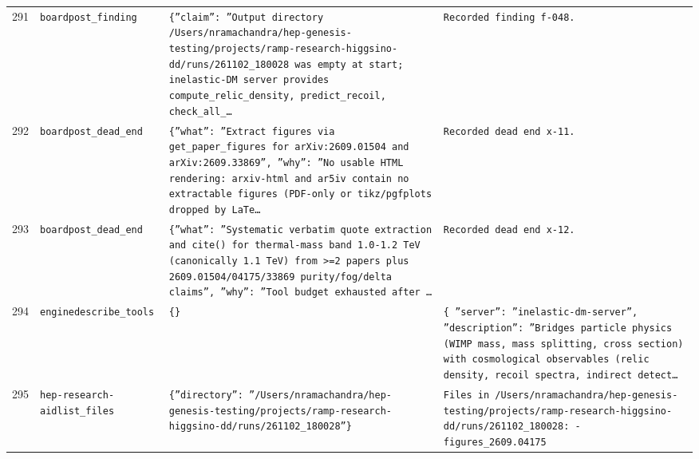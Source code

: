 \documentclass[11pt,a4paper]{article}
\begin{document}
\begin{longtable}{@{}p{}p{}p{}p{}@{}}
291 & \texttt{board}\newline\texttt{post\_\allowbreak{}finding} & \texttt{\{''claim'':\allowbreak{} ''Output directory /\allowbreak{}Users/\allowbreak{}nramachandra/\allowbreak{}hep-genesis-testing/\allowbreak{}projects/\allowbreak{}ramp-research-higgsino-dd/\allowbreak{}runs/\allowbreak{}261102\_\allowbreak{}180028 was empty at start;\allowbreak{} inelastic-DM server provides compute\_\allowbreak{}relic\_\allowbreak{}density,\allowbreak{} predict\_\allowbreak{}recoil,\allowbreak{} check\_\allowbreak{}all\_\allowbreak{}\ldots{}\allowbreak{}} & \texttt{Recorded finding f-048.} \\
292 & \texttt{board}\newline\texttt{post\_\allowbreak{}dead\_\allowbreak{}end} & \texttt{\{''what'':\allowbreak{} ''Extract figures via get\_\allowbreak{}paper\_\allowbreak{}figures for arXiv:\allowbreak{}2609.01504 and arXiv:\allowbreak{}2609.33869'',\allowbreak{} ''why'':\allowbreak{} ''No usable HTML rendering:\allowbreak{} arxiv-html and ar5iv contain no extractable figures (PDF-only or tikz/\allowbreak{}pgfplots dropped by LaTe\ldots{}\allowbreak{}} & \texttt{Recorded dead end x-11.} \\
293 & \texttt{board}\newline\texttt{post\_\allowbreak{}dead\_\allowbreak{}end} & \texttt{\{''what'':\allowbreak{} ''Systematic verbatim quote extraction and cite()\allowbreak{} for thermal-mass band 1.0-1.2 TeV (canonically 1.1 TeV)\allowbreak{} from \textgreater{}\allowbreak{}=\allowbreak{}2 papers plus 2609.01504/\allowbreak{}04175/\allowbreak{}33869 purity/\allowbreak{}fog/\allowbreak{}delta claims'',\allowbreak{} ''why'':\allowbreak{} ''Tool budget exhausted after \ldots{}\allowbreak{}} & \texttt{Recorded dead end x-12.} \\
294 & \texttt{engine}\newline\texttt{describe\_\allowbreak{}tools} & \texttt{\{\}\allowbreak{}} & \texttt{\{   ''server'':\allowbreak{} ''inelastic-dm-server'',\allowbreak{}   ''description'':\allowbreak{} ''Bridges particle physics (WIMP mass,\allowbreak{} mass splitting,\allowbreak{} cross section)\allowbreak{} with cosmological observables (relic density,\allowbreak{} recoil spectra,\allowbreak{} indirect detect\ldots{}\allowbreak{}} \\
295 & \texttt{hep-research-aid}\newline\texttt{list\_\allowbreak{}files} & \texttt{\{''directory'':\allowbreak{} ''/\allowbreak{}Users/\allowbreak{}nramachandra/\allowbreak{}hep-genesis-testing/\allowbreak{}projects/\allowbreak{}ramp-research-higgsino-dd/\allowbreak{}runs/\allowbreak{}261102\_\allowbreak{}180028''\}\allowbreak{}} & \texttt{Files in /\allowbreak{}Users/\allowbreak{}nramachandra/\allowbreak{}hep-genesis-testing/\allowbreak{}projects/\allowbreak{}ramp-research-higgsino-dd/\allowbreak{}runs/\allowbreak{}261102\_\allowbreak{}180028:\allowbreak{}   - figures\_\allowbreak{}2609.04175} \\

\end{longtable}
\end{document}
